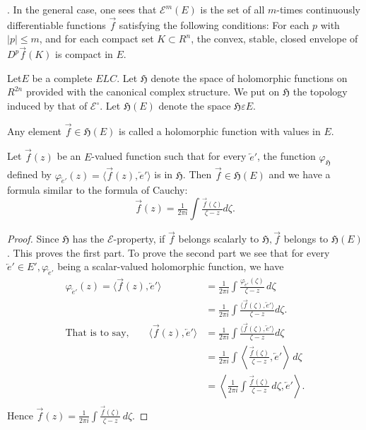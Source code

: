 . In the general
case, one sees that $\mathscr{E}^m(E)$ is the set of all $m$-times
continuously differentiable functions $\overrightarrow{f}$ satisfying
the following conditions: For each $p$ with $|p|\leq m$, and for each
compact set $K \subset R^n$, the convex, stable, closed envelope of
$D^p \overrightarrow{f}(K)$ is compact in $E$. 

Let\pageoriginale $E$ be a complete $E L C$. Let $\mathfrak{H}$ denote
the space of holomorphic functions on $R^{2n}$ provided with the
canonical complex structure. We put on $\mathfrak{H}$ the topology
induced by that of $\mathscr{E}^\circ$. Let $\mathfrak{H}(E)$ denote
the space $\mathfrak{H} \varepsilon E$.

\begin{definition}\label{chap5:def5.5}
Any element $\overrightarrow{f} \in \mathfrak{H}(E)$ is called a
holomorphic function with values in $E$.
\end{definition}

\setcounter{prop}{6}
\begin{prop}\label{chap5:prop5.7}
Let $\overrightarrow{f} (z)$ be an $E$-valued function such that for
every $\overleftarrow{e}'$, the function $\varphi_\mathfrak{H}$
defined by $\varphi_{\overleftarrow{e}'} (z) = \langle
\overrightarrow{f} (z), \overleftarrow{e}'\rangle$ is in
$\mathfrak{H}$. Then $\overrightarrow{f} \in \mathfrak{H} (E)$ and we
have a formula similar to the formula of Cauchy:
$$
\overrightarrow{f} (z) = \tfrac{1}{2\pi i} \int
\tfrac{\overrightarrow{f}(\zeta)}{\zeta - z}d\zeta.
$$
\end{prop}

\begin{proof}
Since $\mathfrak{H}$ has the $\mathcal{E}$-property, if
$\overrightarrow{f}$ belongs scalarly to $\mathfrak{H},
\overrightarrow{f}$ belongs to $\mathfrak{H}(E)$. This proves the
first part. To prove the second part we see that for every
$\overleftarrow{e}' \in E', \varphi_{\overleftarrow{e}'}$ being a
scalar-valued holomorphic function, we have 
\begin{align*}
\varphi_{\overleftarrow{e}'}(z) = \langle \overrightarrow{f} (z),
\overleftarrow{e}' \rangle &= \frac{1}{2 \pi i} \int
\frac{\varphi_{\overleftarrow{e}'} (\zeta)}{\zeta - z}\,d\zeta\\
&= \frac{1}{2 \pi i} \int \frac{\langle \overrightarrow{f}(\zeta),
  \overleftarrow{e}'\rangle}{\zeta - z}d\zeta.\\
\text{That is to say,}\qquad \langle \overrightarrow{f}(z),
\overleftarrow{e}' \rangle &= \frac{1}{2 \pi i} \int \frac{\langle
  \overrightarrow{f} (\zeta), \overleftarrow{e}' \rangle}{\zeta - z}
d\zeta\\ 
&= \frac{1}{2 \pi i} \int \left\langle
\frac{\overrightarrow{f}(\zeta)}{\zeta - z},
\overleftarrow{e}'\right\rangle\, d\zeta\\
&= \left\langle \frac{1}{2 \pi i} \int
\frac{\overrightarrow{f}(\zeta)}{\zeta - z}\, d\zeta,
\overleftarrow{e}'\right\rangle.\\
\end{align*}
Hence $\overrightarrow{f}(z) = \frac{1}{2 \pi i} \int
\frac{\overrightarrow{f}(\zeta)}{\zeta - z}\, d\zeta$.

\end{proof}
